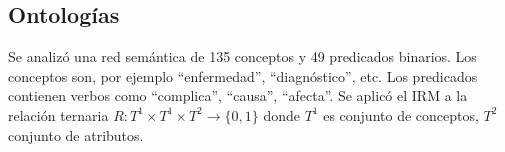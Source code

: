 \documentclass[11pt]{article}
\theoremstyle{plain}
\begin{document}
\subsection{Ontologías}
Se analizó una red semántica de 135 conceptos y 49 predicados binarios. Los conceptos son, por ejemplo “enfermedad”, “diagnóstico”, etc. Los predicados contienen verbos como “complica”, “causa”, “afecta”. Se aplicó el IRM a la relación ternaria $R: T^1 \times T^1 \times T^2 \to \{0,1\}$ donde $T^1$ es conjunto de conceptos, $T^2$ conjunto de atributos.


\end{document}
